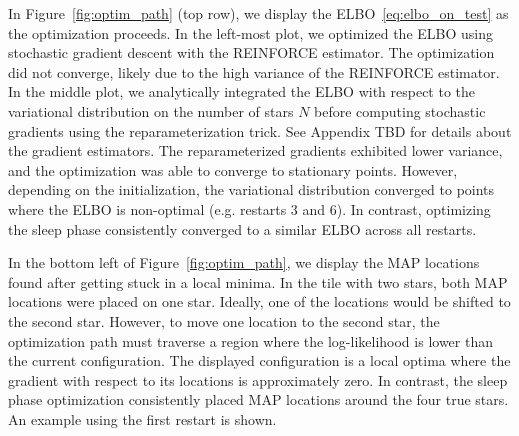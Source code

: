 In Figure~\ref{fig:optim_path} (top row), we display the ELBO~\eqref{eq:elbo_on_test} as the optimization proceeds.
In the left-most plot, we optimized the ELBO using stochastic gradient descent with the REINFORCE estimator.
The optimization did not converge, likely due to the high variance of the REINFORCE estimator. 
In the middle plot, we analytically integrated the ELBO with respect to the variational distribution on the number of stars $N$ before computing stochastic gradients using the reparameterization trick.
See Appendix TBD for details about the gradient estimators. 
The reparameterized gradients exhibited lower variance, and the optimization was able to converge to stationary points. 
However, depending on the initialization, the variational distribution converged to points where the ELBO is non-optimal (e.g. restarts 3 and 6). 
In contrast, optimizing the sleep phase consistently converged to a similar ELBO across all restarts. 

In the bottom left of Figure~\ref{fig:optim_path}, we display the MAP locations found after getting stuck in a local minima. In the tile with two stars, both MAP locations were placed on one star. Ideally, one of the locations would be shifted to the second star. However, to move one location to the second star, the optimization path must traverse a region where the log-likelihood is lower than the current configuration. The displayed configuration is a local optima where the gradient with respect to its locations is approximately zero. In contrast, the sleep phase optimization consistently placed MAP locations around the four true stars. An example using the first restart is shown. 


